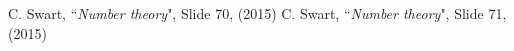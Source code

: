 \begin{thebibliography}{99}

C. Swart, ``{\it Number theory}", Slide 70, (2015)
C. Swart, ``{\it Number theory}", Slide 71, (2015)
    
\end{thebibliography}
